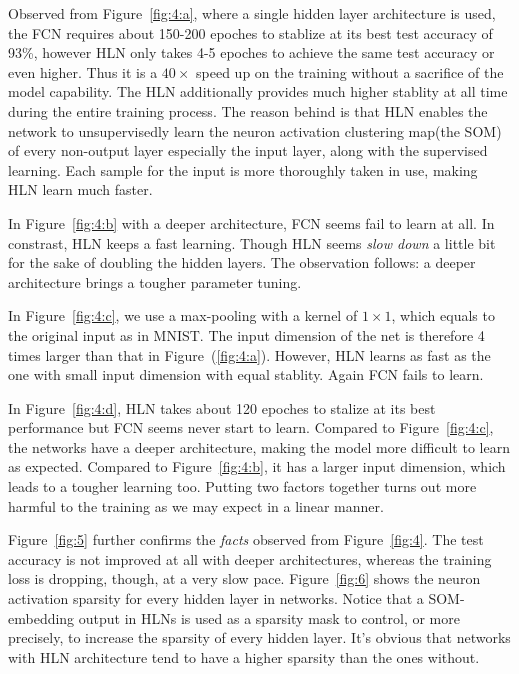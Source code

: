 \documentclass[3p,times,procedia]{elsarticle}
\begin{document}
Observed from Figure~\ref{fig:4:a}, 
where a single hidden layer 
architecture is used,
the FCN requires about 
150-200 epoches to stablize 
at its best test accuracy of 
93\%, however HLN
only takes 4-5 epoches to achieve 
the same test 
accuracy or even higher. 
Thus it is a $40\times$ speed up 
on the training without a sacrifice 
of the
model capability. 
The HLN additionally provides
much higher stablity at all time 
during the entire
training process. 
The reason behind is that
HLN enables 
the network to unsupervisedly
learn the neuron activation 
clustering map(the SOM) of 
every non-output layer
especially the input layer,
along with
the supervised learning. 
Each sample for the input
is more thoroughly taken in use, 
making HLN learn much faster.

In Figure~\ref{fig:4:b} with 
a deeper architecture,
FCN seems fail to learn at all.
In constrast, HLN keeps a fast 
learning. Though HLN seems 
\emph{slow down} a little bit for
the sake of doubling the hidden layers.
The observation follows: a deeper
architecture brings a tougher 
parameter tuning.

In Figure~\ref{fig:4:c}, 
we use a max-pooling with a kernel 
of $1\times 1$,
which equals to the original input as 
in MNIST.
The input dimension of the net 
is therefore 4 
times larger than that in 
Figure~(\ref{fig:4:a}).
However,
HLN learns as fast as the one 
with small input
dimension with equal stablity.
Again FCN fails to learn.

In Figure~\ref{fig:4:d}, 
HLN takes about 120
epoches to stalize at its 
best performance but
FCN seems never start to learn.
Compared to Figure~\ref{fig:4:c}, 
the networks have a
deeper architecture, 
making the model more difficult
to learn as expected.  
Compared to Figure~\ref{fig:4:b},
it has a larger input dimension, 
which leads to a
tougher learning too. 
Putting two factors together
turns out more harmful to
the training as we may expect 
in a linear manner.

Figure~\ref{fig:5} further confirms 
the \emph{facts} 
observed from Figure~\ref{fig:4}.
The test accuracy is not improved at all
with deeper architectures,
whereas the training loss is dropping, 
though, at a very slow pace. 
Figure~\ref{fig:6} shows the neuron 
activation sparsity for every hidden 
layer in networks.
Notice that a SOM-embedding output 
in HLNs is used as a sparsity mask 
to control, or more
precisely, to increase the sparsity 
of every hidden layer. 
It's obvious that networks with 
HLN architecture tend to have a higher 
sparsity than the ones without.
\end{document}
